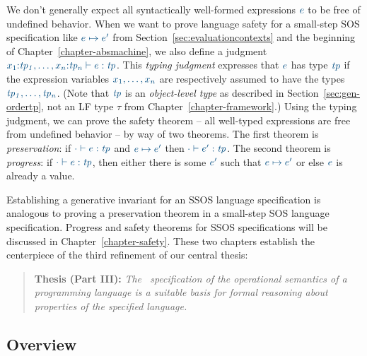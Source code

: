 We don't generally expect all syntactically well-formed expressions
$\obj{e}$ to be free of undefined behavior. When we want to prove
language safety for a small-step SOS specification like $\obj{e
  \mapsto e'}$ from Section~\ref{sec:evaluationcontexts} and the
beginning of Chapter~\ref{chapter-absmachine}, we also define a
judgment $\obj{x_1{:}{\it tp_1},\ldots, x_n{:}{\it tp_n} \vdash e :
  {\it tp}}$.  This {\it typing judgment} expresses that $\obj{e}$ has
type $\obj{\it tp}$ if the expression variables $\obj{x_1, \ldots,
  x_n}$ are respectively assumed to have the types $\obj{\it tp_1,
  \ldots, tp_n}$. (Note that $\obj{\it tp}$ is an {\it object-level
  type} as described in Section~\ref{sec:gen-ordertp}, not an LF type
$\tau$ from Chapter~\ref{chapter-framework}.) Using the typing
judgment, we can prove the safety theorem -- all well-typed
expressions are free from undefined behavior -- by way of two
theorems. The first theorem is {\it preservation}: if $\obj{\cdot
  \vdash e : {\it tp}}$ and $\obj{e \mapsto e'}$ then $\obj{\cdot
  \vdash e' : {\it tp}}$. The second theorem is {\it progress}: if
$\obj{\cdot \vdash e : {\it tp}}$, then either there is some
$\obj{e'}$ such that $\obj{e \mapsto e'}$ or else $\obj{e}$ is already
a value.

Establishing a generative invariant for an SSOS language specification
is analogous to proving a preservation theorem in a small-step SOS
language specification. Progress and safety theorems for SSOS
specifications will be discussed in Chapter~\ref{chapter-safety}.
These two chapters establish the centerpiece of the third refinement
of our central thesis:

\smallskip
\begin{quote} 
  {\bf Thesis (Part III):} {\it The \sls~specification of the operational
    semantics of a programming language is a suitable basis for formal
    reasoning about properties of the specified language.}
\end{quote} 


\subsection*{Overview}

